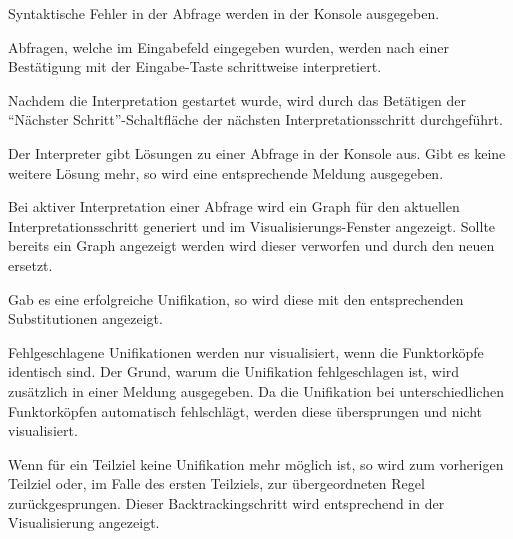 \documentclass[parskip=full,11pt,twoside]{scrartcl}
\begin{document}
Syntaktische Fehler in der Abfrage werden in der Konsole ausgegeben.


Abfragen, welche im Eingabefeld eingegeben wurden, werden nach einer Bestätigung mit der Eingabe-Taste schrittweise interpretiert.


Nachdem die Interpretation gestartet wurde, wird durch das Betätigen der \enquote{Nächster Schritt}-Schaltfläche der nächsten Interpretationsschritt durchgeführt.


Der Interpreter gibt Lösungen zu einer Abfrage in der Konsole aus. Gibt es keine weitere Lösung mehr, so wird eine entsprechende Meldung ausgegeben.


Bei aktiver Interpretation einer Abfrage wird ein Graph für den aktuellen Interpretationsschritt generiert und im Visualisierungs-Fenster angezeigt. Sollte bereits ein Graph angezeigt werden wird dieser verworfen und durch den neuen ersetzt.


Gab es eine erfolgreiche Unifikation, so wird diese mit den entsprechenden Substitutionen angezeigt.


Fehlgeschlagene Unifikationen werden nur visualisiert, wenn die Funktorköpfe identisch sind. Der Grund, warum die Unifikation fehlgeschlagen ist, wird zusätzlich in einer Meldung ausgegeben. Da die Unifikation bei unterschiedlichen Funktorköpfen automatisch fehlschlägt, werden diese übersprungen und nicht visualisiert.


Wenn für ein Teilziel keine Unifikation mehr möglich ist, so wird zum vorherigen Teilziel oder, im Falle des ersten Teilziels, zur übergeordneten Regel zurückgesprungen. Dieser Backtrackingschritt wird entsprechend in der Visualisierung angezeigt.
\end{document}
